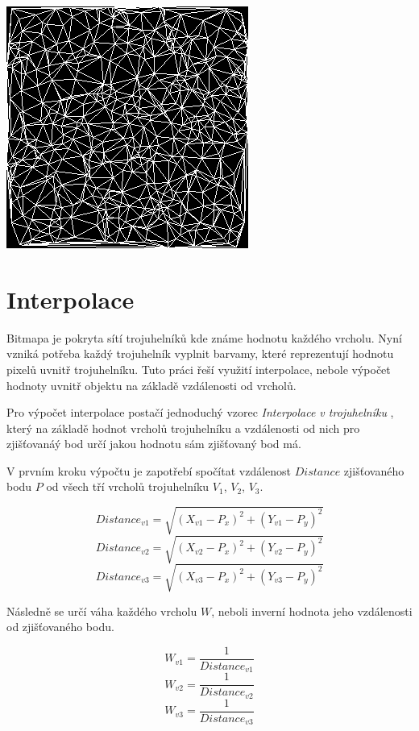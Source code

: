 \documentclass[czech,bachelor,dept460,male,csharp,cpdeclaration]{diploma}
\begin{document}
	\begin{center}
		\includegraphics{Data/bmp_triangulace.png}
	\end{center}
	
	\section{Interpolace}
	
	Bitmapa je pokryta sítí trojuhelníků kde známe hodnotu každého vrcholu. Nyní vzniká potřeba každý trojuhelník vyplnit barvamy, které reprezentují hodnotu pixelů uvnitř trojuhelníku. Tuto práci řeší využití interpolace, nebole výpočet hodnoty uvnitř objektu na základě vzdálenosti od vrcholů.
	
	Pro výpočet interpolace postačí jednoduchý vzorec \emph{Interpolace v trojuhelníku} \cite{interp}, který na základě hodnot vrcholů trojuhelníku a vzdálenosti od nich pro zjišťovanáý bod určí jakou hodnotu sám zjišťovaný bod má.
	
	
	V prvním kroku výpočtu je zapotřebí spočítat vzdálenost $Distance$ zjišťovaného bodu $P$ od všech tří vrcholů trojuhelníku $V_1$, $V_2$, $V_3$. 
	
	\[Distance_{v1} =\sqrt{(X_{v1}-P_x)^2+(Y_{v1}-P_y)^2}\]
	\[Distance_{v2} =\sqrt{(X_{v2}-P_x)^2+(Y_{v2}-P_y)^2}\]
	\[Distance_{v3} =\sqrt{(X_{v3}-P_x)^2+(Y_{v3}-P_y)^2}\]
	
	Následně se určí váha každého vrcholu $W$, neboli inverní hodnota jeho vzdálenosti od zjišťovaného bodu.
	
	\[W_{v1} =\frac{1}{Distance_{v1}}\]
	\[W_{v2} =\frac{1}{Distance_{v2}}\]
	\[W_{v3} =\frac{1}{Distance_{v3}}\]
	
\end{document}
